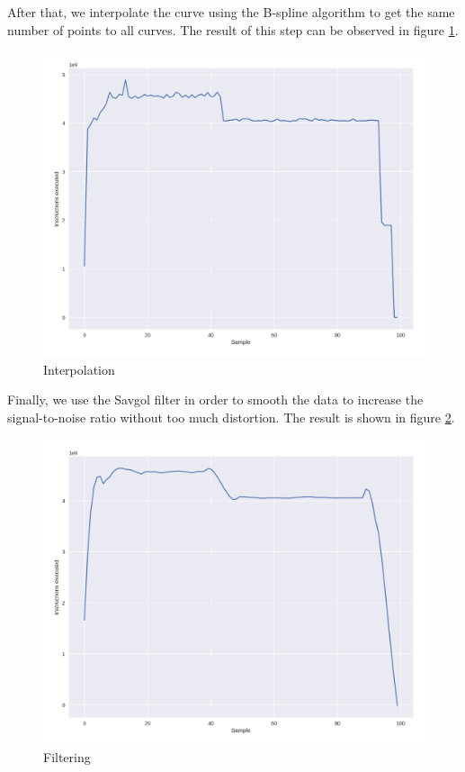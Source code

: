  After that, we interpolate the curve using the B-spline \cite{Hang2017CubicApplications} algorithm to get the same number of points to all curves. 
 The result of this step can be observed in figure \ref{fig:interporlation}. 

\begin{figure}[H]
    \centering
    \includegraphics[width=\textwidth]{fingerprint/figures/workflow_2.png}
    \caption{Interpolation}
    \label{fig:interporlation}
\end{figure}

Finally, we use the Savgol filter \cite{Luo2005PropertiesDifferentiators} in order to smooth the data to increase the signal-to-noise ratio without too much distortion. The result is shown in figure \ref{fig:filtering}.

\begin{figure}[H]
    \centering
    \includegraphics[width=\textwidth]{fingerprint/figures/workflow_3.png}
    \caption{Filtering}
    \label{fig:filtering}
\end{figure}




